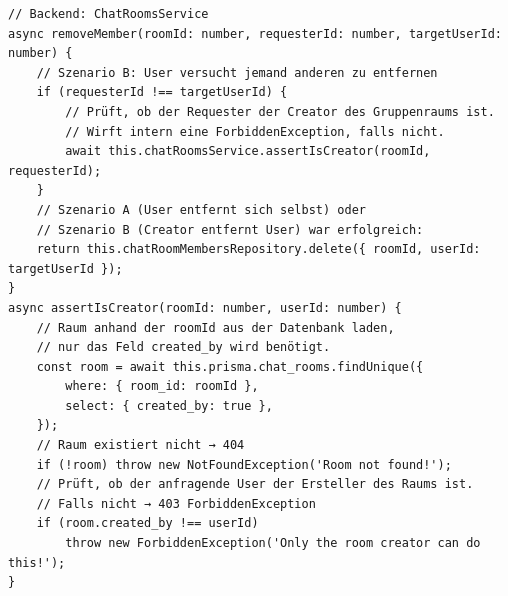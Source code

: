 \begin{listing}[H]
\begin{verbatim}
// Backend: ChatRoomsService
async removeMember(roomId: number, requesterId: number, targetUserId: number) {
    // Szenario B: User versucht jemand anderen zu entfernen
    if (requesterId !== targetUserId) {
        // Prüft, ob der Requester der Creator des Gruppenraums ist. 
        // Wirft intern eine ForbiddenException, falls nicht.
        await this.chatRoomsService.assertIsCreator(roomId, requesterId);
    }
    // Szenario A (User entfernt sich selbst) oder
    // Szenario B (Creator entfernt User) war erfolgreich:
    return this.chatRoomMembersRepository.delete({ roomId, userId: targetUserId });
}
async assertIsCreator(roomId: number, userId: number) {
    // Raum anhand der roomId aus der Datenbank laden,
    // nur das Feld created_by wird benötigt.
    const room = await this.prisma.chat_rooms.findUnique({
        where: { room_id: roomId },
        select: { created_by: true },
    });
    // Raum existiert nicht → 404
    if (!room) throw new NotFoundException('Room not found!');
    // Prüft, ob der anfragende User der Ersteller des Raums ist.
    // Falls nicht → 403 ForbiddenException
    if (room.created_by !== userId)
        throw new ForbiddenException('Only the room creator can do this!');
}
\end{verbatim}
\caption{Berechtigungsprüfung beim Entfernen von Mitgliedern aus einem Gruppenchat}
\label{lst:chat_permissions}
\end{listing}